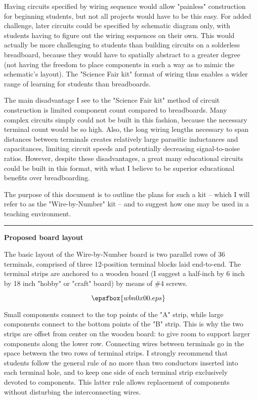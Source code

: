 Having circuits specified by wiring sequence would allow "painless" construction for beginning students, but not all projects would have to be this easy.  For added challenge, later circuits could be specified by schematic diagram only, with students having to figure out the wiring sequences on their own.  This would actually be more challenging to students than building circuits on a solderless breadboard, because they would have to spatially abstract to a greater degree (not having the freedom to place components in such a way as to mimic the schematic's layout).  The "Science Fair kit" format of wiring thus enables a wider range of learning for students than breadboards.

The main disadvantage I see to the "Science Fair kit" method of circuit construction is limited component count compared to breadboards.  Many complex circuits simply could not be built in this fashion, because the necessary terminal count would be so high.  Also, the long wiring lengths necessary to span distances between terminals creates relatively large parasitic inductances and capacitances, limiting circuit speeds and potentially decreasing signal-to-noise ratios.  However, despite these disadvantages, a great many educational circuits could be built in this format, with what I believe to be superior educational benefits over breadboarding.

\vskip 10pt

The purpose of this document is to outline the plans for such a kit -- which I will refer to as the "Wire-by-Number" kit -- and to suggest how one may be used in a teaching environment.

\bigskip 

\hrule

\vskip 10pt

\centerline{\bf Proposed board layout} \bigskip 

\vskip 10pt

The basic layout of the Wire-by-Number board is two parallel rows of 36 terminals, comprised of three 12-position terminal blocks laid end-to-end.  The terminal strips are anchored to a wooden board (I suggest a half-inch by 6 inch by 18 inch "hobby" or "craft" board) by means of \#4 screws.

$$\epsfbox{wbn0x00.eps}$$

Small components connect to the top points of the "A" strip, while large components connect to the bottom points of the "B" strip.  This is why the two strips are offset from center on the wooden board: to give room to support larger components along the lower row.  Connecting wires between terminals go in the space between the two rows of terminal strips.  I strongly recommend that students follow the general rule of no more than two conductors inserted into each terminal hole, and to keep one side of each terminal strip exclusively devoted to components.  This latter rule allows replacement of components without disturbing the interconnecting wires.


